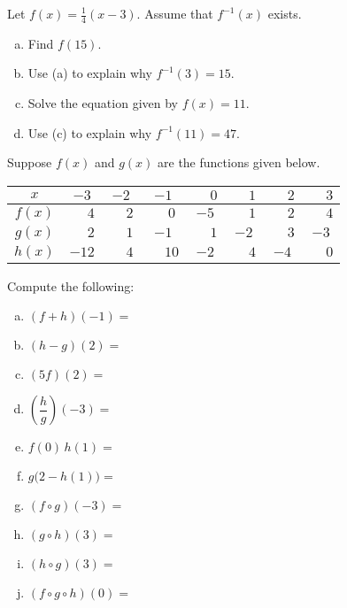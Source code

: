 \documentclass[11pt,letterpaper]{article}
\begin{document}
\prob Let $f(x)= \frac{1}{4} (x - 3)$. Assume that $f^{-1}(x)$ exists. 
	\begin{enumerate}[(a)]
	\item Find $f(15)$. 
	\item Use (a) to explain why $f^{-1}(3)= 15$. 
	\item Solve the equation given by $f(x)= 11$.
	\item Use (c) to explain why $f^{-1}(11)= 47$. 
	\end{enumerate} \pspace


\prob Suppose $f(x)$ and $g(x)$ are the functions given below. 
        \begin{table}[H]
        \centering
        \begin{tabular}{| c || c | c | c | c | c | c | c |} \hline
	$x$ & $-3$ & $-2$ & $-1$ & $\phantom{-}0$ & $\phantom{-}1$ & $\phantom{-}2$ & $\phantom{-}3$ \\ \hline
	$f(x)$ & $\phantom{-1}4$ & $\phantom{-}2$ & $\phantom{-}0$ & $-5$ & $\phantom{-}1$ & $\phantom{-}2$ & $\phantom{-}4$ \\ \hline
	$g(x)$ & $\phantom{-1}2$ & $\phantom{-}1$ & $-1$ & $\phantom{-}1$ & $-2$ & $\phantom{-}3$ & $-3$ \\ \hline
	$h(x)$ & $-12$ & $\phantom{-}4$ & $\phantom{-}10$ & $-2$ & $\phantom{-}4$ & $-4$ & $\phantom{-}0$ \\ \hline
        \end{tabular}
        \end{table}

Compute the following: \pspace
        \begin{enumerate}[(a)]
        \item $(f + h)(-1)=$ 
        \item $(h - g)(2)=$ 
        \item $(5f)(2)=$ 
        \item $\left(\dfrac{h}{g}\right)(-3)=$ 
        \item $f(0)\, h(1)=$ 
        \item $g \big(2 - h(1) \big)=$ 
        \item $(f \circ g)(-3)=$ 
	\item $(g \circ h)(3)=$ 
        \item $(h \circ g)(3)=$ 
	\item $(f \circ g \circ h)(0)=$ 
        \end{enumerate}  \pspace
\end{document}
